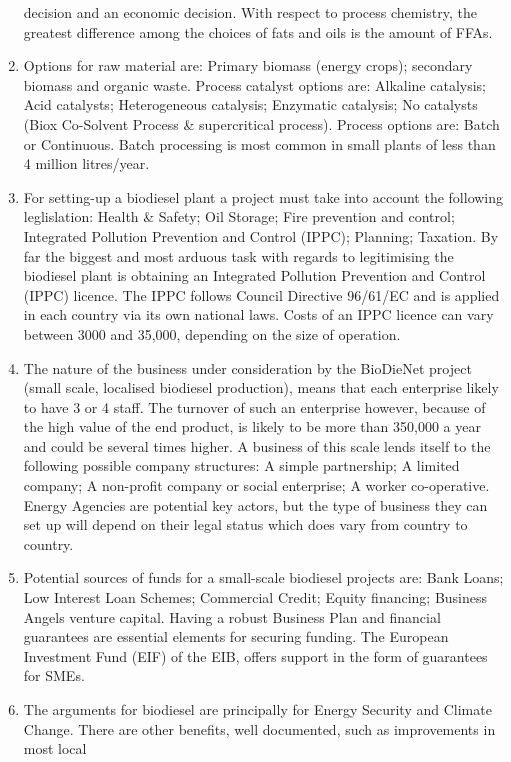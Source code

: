 \documentclass[11pt,fleqn,oneside]{book} %
\begin{document}
\begin{enumerate}
	decision and an economic decision. With respect to process chemistry, the greatest
	difference among the choices of fats and oils is the amount of FFAs.
	\item Options for raw material are: Primary biomass (energy crops); secondary biomass and
	organic waste. Process catalyst options are: Alkaline catalysis; Acid catalysts;
	Heterogeneous catalysis; Enzymatic catalysis; No catalysts (Biox Co-Solvent Process \&
	supercritical process). Process options are: Batch or Continuous. Batch processing is
	most common in small plants of less than 4 million litres/year.
	\item For setting-up a biodiesel plant a project must take into account the following leglislation:
	Health \& Safety; Oil Storage; Fire prevention and control; Integrated Pollution Prevention
	and Control (IPPC); Planning; Taxation. By far the biggest and most arduous task with
	regards to legitimising the biodiesel plant is obtaining an Integrated Pollution Prevention
	and Control (IPPC) licence. The IPPC follows Council Directive 96/61/EC and is applied
	in each country via its own national laws. Costs of an IPPC licence can vary between
	3000 and %
	35,000, depending on the size of operation.
	\item The nature of the business under consideration by the BioDieNet project (small scale,
	localised biodiesel production), means that each enterprise likely to have 3 or 4 staff. The
	turnover of such an enterprise however, because of the high value of the end product, is
	likely to be more than %
	350,000 a year and could be several times higher. A business of
	this scale lends itself to the following possible company structures: A simple partnership;
	A limited company; A non-profit company or social enterprise; A worker co-operative.
	Energy Agencies are potential key actors, but the type of business they can set up will
	depend on their legal status which does vary from country to country.
	\item Potential sources of funds for a small-scale biodiesel projects are: Bank Loans; Low
	Interest Loan Schemes; Commercial Credit; Equity financing; Business Angels venture
	capital. Having a robust Business Plan and financial guarantees are essential elements
	for securing funding. The European Investment Fund (EIF) of the EIB, offers support in
	the form of guarantees for SMEs.
	\item The arguments for biodiesel are principally for Energy Security and Climate Change.
	There are other benefits, well documented, such as improvements in most local

\end{enumerate}
\end{document}
